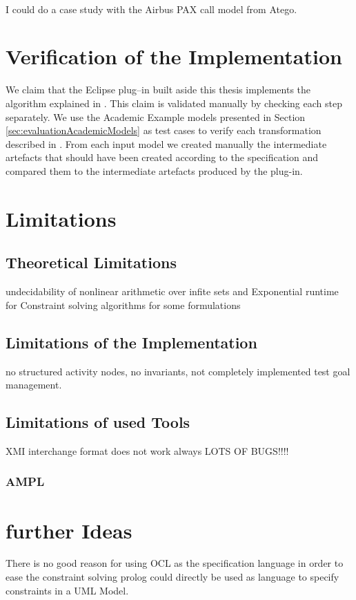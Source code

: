 I could do a case study with the Airbus PAX call model from Atego\textsuperscript{\textregistered }.
\section{Verification of the Implementation}
We claim that the Eclipse plug--in built aside this thesis implements the algorithm explained in . This claim is validated manually by checking each step separately. We use the Academic Example models presented in Section \ref{sec:evaluationAcademicModels} as test cases to verify each transformation described in . From each input model we created manually the intermediate artefacts that should have been created according to the specification and compared them to the intermediate artefacts produced by the plug-in.
\section{Limitations}
\label{sec:evaluationLimitations}
\subsection{Theoretical Limitations}
undecidability of nonlinear arithmetic over infite sets and Exponential runtime for Constraint solving algorithms for some formulations
\subsection{Limitations of the Implementation}
no structured activity nodes, no invariants, not completely implemented test goal management.
\subsection{Limitations of used Tools}
XMI interchange format does not work always LOTS OF BUGS!!!!
\subsubsection{AMPL}
\label{sec:LimitationsAMPL}
\section{further Ideas}
There is no good reason for using OCL as the specification language in order to ease the constraint solving prolog could directly be used as language to specify constraints in a UML Model.


